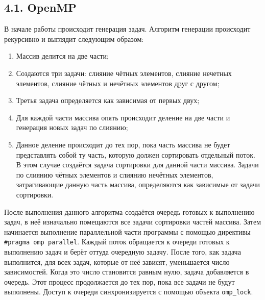 \documentclass{report}
\begin{document}
    \subsection*{4.1. OpenMP}
    \par В начале работы происходит генерация задач. Алгоритм генерации происходит рекурсивно и выглядит следующим образом:
    \begin{enumerate}
        \item Массив делится на две части;
        \item Создаются три задачи: слияние чётных элементов, слияние нечетных элементов, слияние чётных и нечётных элементов друг с другом;
        \item Третья задача определяется как зависимая от первых двух;
        \item Для каждой части массива опять происходит деление на две части и генерация новых задач по слиянию;
        \item Данное деление происходит до тех пор, пока часть массива не будет представлять собой ту часть, которую должен сортировать отдельный поток. В этом случае создаётся задача сортировки для данной части массива. Задачи по слиянию чётных элементов и слиянию нечётных элементов, затрагивающие данную часть массива, определяются как зависимые от задачи сортировки.
    \end{enumerate}
    \par После выполнения данного алгоритма создаётся очередь готовых к выполнению задач, в неё изначально помещаются все задачи сортировки частей массива. Затем начинается выполнение параллельной части программы с помощью директивы \verb|#pragma omp parallel|. Каждый поток обращается к очереди готовых к выполнению задач и берёт оттуда очередную задачу. После того, как задача выполнится, для всех задач, которые от неё зависят, уменьшается число зависимостей. Когда это число становится равным нулю, задача добавляется в очередь. Этот процесс продолжается до тех пор, пока все задачи не будут выполнены. Доступ к очереди синхронизируется с помощью объекта \verb|omp_lock|.

\end{document}
